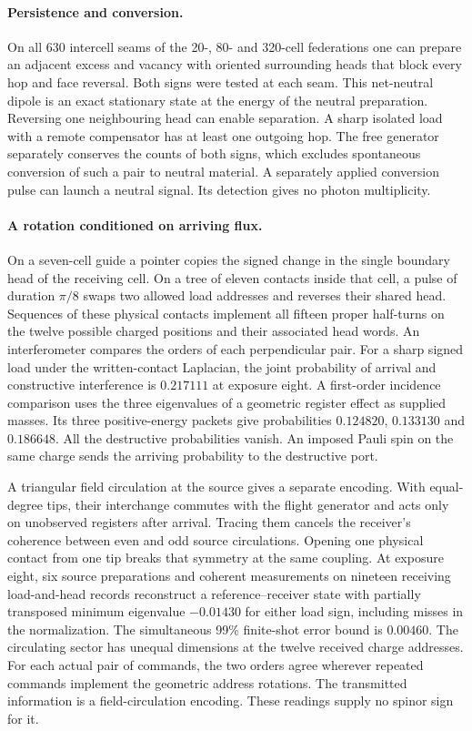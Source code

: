 \documentclass[11pt]{article}
\theoremstyle{definition}
\theoremstyle{remark}
\theoremstyle{plain}
\begin{document}
\paragraph{Persistence and conversion.}
On all 630 intercell seams of the 20-, 80- and 320-cell federations one
can prepare an adjacent excess and vacancy with oriented surrounding
heads that block every hop and face reversal. Both signs were tested at
each seam. This net-neutral dipole is an exact stationary state at the
energy of the neutral preparation. Reversing one neighbouring head can
enable separation. A sharp isolated load with a remote compensator has
at least one outgoing hop. The free generator separately conserves the
counts of both signs, which excludes spontaneous conversion of such a
pair to neutral material. A separately applied conversion pulse can
launch a neutral signal. Its detection gives no photon multiplicity.

\paragraph{A rotation conditioned on arriving flux.}
On a seven-cell guide a pointer copies the signed change in the single
boundary head of the receiving cell. On a tree of eleven contacts inside
that cell, a pulse of duration $\pi/8$ swaps two allowed load addresses
and reverses their shared head. Sequences of these physical contacts
implement all fifteen proper half-turns on the twelve possible charged
positions and their associated head words. An interferometer compares
the orders of each perpendicular pair. For a sharp signed load under the
written-contact Laplacian, the joint probability of arrival and constructive
interference is $0.217111$ at exposure eight. A first-order incidence
comparison uses the three eigenvalues of a geometric register effect as
supplied masses. Its three positive-energy packets give probabilities
$0.124820$, $0.133130$ and $0.186648$. All the destructive probabilities
vanish. An imposed Pauli spin on the same charge sends the arriving
probability to the destructive port.

A triangular field circulation at the source gives a separate encoding.
With equal-degree tips, their interchange commutes with the flight
generator and acts only on unobserved registers after arrival. Tracing
them cancels the receiver's coherence between even and odd source
circulations. Opening one physical contact from one tip breaks that
symmetry at the same coupling. At exposure eight, six source preparations
and coherent measurements on nineteen receiving load-and-head records
reconstruct a reference--receiver state with partially transposed
minimum eigenvalue $-0.01430$ for either load sign, including misses in
the normalization. The simultaneous 99\% finite-shot error bound is
$0.00460$. The circulating sector has unequal dimensions at the twelve
received charge addresses. For each actual pair of commands, the two
orders agree wherever repeated commands implement the geometric
address rotations. The transmitted information is a field-circulation
encoding. These readings supply no spinor sign for it.
\end{document}
